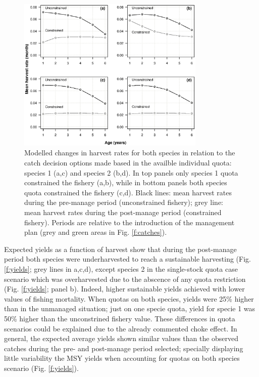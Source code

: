 \documentclass[12pt,oneline,a4paper,numbib]{ouparticle}
\numberwithin{equation}{subsection} %
\begin{document}
\begin{figure}[!ht]
\centering
\includegraphics[width=0.8\textwidth]{Figures/Selectivity.eps} 
\caption{Modelled changes in harvest rates for both species in relation to the catch decision options made based in the availble individual quota: species 1 (a,c) and species 2 (b,d). In top panels only species 1 quota constrained the fishery (a,b), while in bottom panels both species quota constrained the fishery (c,d). Black lines: mean harvest rates during the pre-manage period (unconstrained fishery); grey line: mean harvest rates during the post-manage period (constrained fishery). Periods are relative to the introduction of the management plan (grey and green areas in Fig. \ref{f:catches}).}
\label{f:selectivity}
\end{figure}
 
Expected yields as a function of harvest show that during the post-manage period both species were underharvested to reach a sustainable harvesting (Fig. \ref{f:yields}; grey lines in a,c,d), except species 2 in the single-stock quota case scenario which was overharvested due to the abscence of any quota restriction (Fig. \ref{f:yields}; panel b). Indeed, higher sustainable yields achieved with lower values of fishing mortality. When quotas on both species, yields were 25\% higher than in the unmanaged situation; just on one specie quota, yield for specie 1 was 50\% higher than the unconstrined fishery value. These differences in quota scenarios could be explained due to the already commented choke effect. In general, the expected average yields shown similar values than the observed catches during the pre- and post-manage period selected; specially displaying little variability the MSY yields when accounting for quotas on both species scenario (Fig. \ref{f:yields}).
\end{document}
